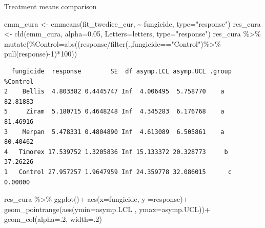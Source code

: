 \documentclass[
  letterpaper,
  DIV=11,
  numbers=noendperiod]{scrreport}
\newenvironment{Shaded}{\begin{snugshade}}{\end{snugshade}}
\newcommand{\AttributeTok}[1]{\textcolor[rgb]{0.40,0.45,0.13}{#1}}
\newcommand{\DecValTok}[1]{\textcolor[rgb]{0.68,0.00,0.00}{#1}}
\newcommand{\FloatTok}[1]{\textcolor[rgb]{0.68,0.00,0.00}{#1}}
\newcommand{\FunctionTok}[1]{\textcolor[rgb]{0.28,0.35,0.67}{#1}}
\newcommand{\NormalTok}[1]{\textcolor[rgb]{0.00,0.23,0.31}{#1}}
\newcommand{\OtherTok}[1]{\textcolor[rgb]{0.00,0.23,0.31}{#1}}
\newcommand{\SpecialCharTok}[1]{\textcolor[rgb]{0.37,0.37,0.37}{#1}}
\newcommand{\StringTok}[1]{\textcolor[rgb]{0.13,0.47,0.30}{#1}}
\begin{document}
Treatment means comparison

\begin{Shaded}
\begin{Highlighting}[]
\NormalTok{emm\_cura }\OtherTok{\textless{}{-}} \FunctionTok{emmeans}\NormalTok{(fit\_twediee\_cur, }\SpecialCharTok{\textasciitilde{}}\NormalTok{ fungicide, }\AttributeTok{type=}\StringTok{"response"}\NormalTok{) }
\NormalTok{res\_cura }\OtherTok{\textless{}{-}} \FunctionTok{cld}\NormalTok{(emm\_cura, }\AttributeTok{alpha=}\FloatTok{0.05}\NormalTok{, }\AttributeTok{Letters=}\NormalTok{letters,  }\AttributeTok{type=}\StringTok{"response"}\NormalTok{)}
\NormalTok{res\_cura }\SpecialCharTok{\%\textgreater{}\%} 
    \FunctionTok{mutate}\NormalTok{(}\StringTok{\textasciigrave{}}\AttributeTok{\%Control}\StringTok{\textasciigrave{}}\OtherTok{=}\FunctionTok{abs}\NormalTok{((response}\SpecialCharTok{/}\FunctionTok{filter}\NormalTok{(.,fungicide}\SpecialCharTok{==}\StringTok{"Control"}\NormalTok{)}\SpecialCharTok{\%\textgreater{}\%} \FunctionTok{pull}\NormalTok{(response)}\SpecialCharTok{{-}}\DecValTok{1}\NormalTok{)}\SpecialCharTok{*}\DecValTok{100}\NormalTok{)) }
\end{Highlighting}
\end{Shaded}

\begin{verbatim}
  fungicide  response        SE  df asymp.LCL asymp.UCL .group %Control
2    Bellis  4.803382 0.4445747 Inf  4.006495  5.758770    a   82.81883
5     Ziram  5.180715 0.4648248 Inf  4.345283  6.176768    a   81.46916
3    Merpan  5.478331 0.4804890 Inf  4.613089  6.505861    a   80.40462
4   Timorex 17.539752 1.3205836 Inf 15.133372 20.328773     b  37.26226
1   Control 27.957257 1.9647959 Inf 24.359778 32.086015      c  0.00000
\end{verbatim}

\begin{Shaded}
\begin{Highlighting}[]
\NormalTok{res\_cura }\SpecialCharTok{\%\textgreater{}\%} 
  \FunctionTok{ggplot}\NormalTok{()}\SpecialCharTok{+}
  \FunctionTok{aes}\NormalTok{(}\AttributeTok{x=}\NormalTok{fungicide, }\AttributeTok{y =}\NormalTok{response)}\SpecialCharTok{+}
  \FunctionTok{geom\_pointrange}\NormalTok{(}\FunctionTok{aes}\NormalTok{(}\AttributeTok{ymin=}\NormalTok{asymp.LCL , }\AttributeTok{ymax=}\NormalTok{asymp.UCL))}\SpecialCharTok{+}
  \FunctionTok{geom\_col}\NormalTok{(}\AttributeTok{alpha=}\NormalTok{.}\DecValTok{2}\NormalTok{, }\AttributeTok{width=}\NormalTok{.}\DecValTok{2}\NormalTok{)}
\end{Highlighting}
\end{Shaded}
\end{document}
